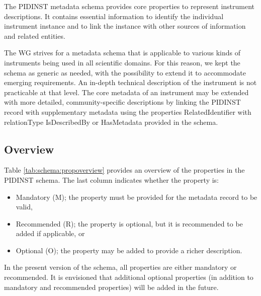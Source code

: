 \documentclass[titlepage=true,twoside=false,DIV=13]{scrartcl}
\begin{document}
The PIDINST metadata schema provides core properties to represent
instrument descriptions.  It contains essential information to
identify the individual instrument instance and to link the instance
with other sources of information and related entities.

The WG strives for a metadata schema that is applicable to various
kinds of instruments being used in all scientific domains.  For this
reason, we kept the schema as generic as needed, with the possibility
to extend it to accommodate emerging requirements.  An in-depth
technical description of the instrument is not practicable at that
level.  The core metadata of an instrument may be extended with more
detailed, community-specific descriptions by linking the PIDINST
record with supplementary metadata using the properties
RelatedIdentifier with relationType IsDescribedBy or HasMetadata
provided in the schema.

\subsection{Overview}

Table \ref{tab:schema:propoverview} provides an overview of the
properties in the PIDINST schema.  The last column indicates whether
the property is:
\begin{itemize}
\item Mandatory (M); the property must be provided for the metadata
  record to be valid,
\item Recommended (R); the property is optional, but it is recommended
  to be added if applicable, or
\item Optional (O); the property may be added to provide a richer
  description.
\end{itemize}
In the present version of the schema, all properties are either
mandatory or recommended.  It is envisioned that additional optional
properties (in addition to mandatory and recommended properties) will
be added in the future.
\end{document}
